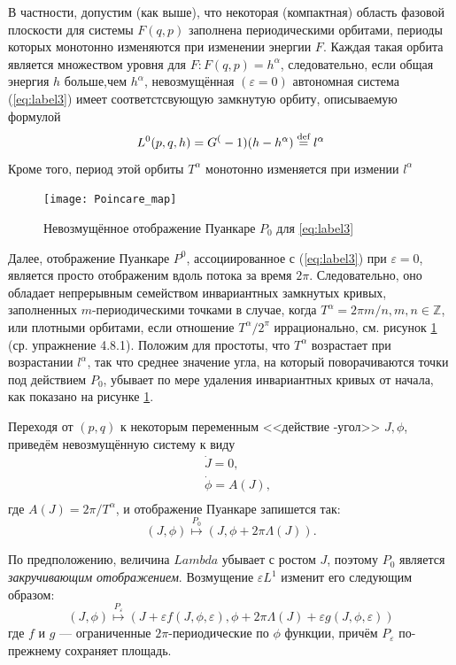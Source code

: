 \documentclass[twoside, a4paper]{article}
\begin{document}
В частности, допустим (как выше), что некоторая (компактная) область фазовой плоскости для системы $F(q,p)$ заполнена периодическими орбитами, периоды которых монотонно изменяются при изменении энергии $F$. Каждая такая орбита является множеством уровня для $F:F(q,p)=h^\alpha$, следовательно, если общая энергия $h$ больше,чем $h^\alpha$, невозмущённая $(\varepsilon=0)$ автономная система (\ref{eq:label3}) имеет соответстсвующую замкнутую орбиту, описываемую формулой
\begin{equation}
L^0(p,q,h)=G^(-1)(h-h^\alpha)\stackrel{\text{def}}{=} l^\alpha
\end{equation}
\renewcommand{\thefigure}{4.8.\arabic{figure}}
Кроме того, период этой орбиты $T^\alpha$ монотонно изменяется при измении $l^\alpha$
\begin{figure}[h]
\centering
\texttt{[image: Poincarе\_map]}
\caption{Невозмущённое отображение Пуанкаре $P_0$ для \ref{eq:label3}}
\label{fig:pic1}
\end{figure}

Далее, отображение Пуанкаре $P^0$, ассоциированное с (\ref{eq:label3}) при $\varepsilon = 0$, является просто отображеним вдоль потока за время $2\pi$. Следовательно, оно обладает непрерывным семейством инвариантных замкнутых кривых, заполненных $m$-периодическими точками в случае, когда $T^\alpha = 2\pi m/n, m,n \in \mathbb{Z}$, или плотными орбитами, если отношение $T^\alpha / 2^\pi$ иррационально, см. рисунок \ref{fig:pic1} (ср. упражнение 4.8.1). Положим для простоты, что $T^\alpha$ возрастает при возрастании $l^\alpha$, так что среднее значение угла, на который поворачиваются точки под действием $P_0$, убывает по мере удаления инвариантных кривых от начала, как показано на рисунке \ref{fig:pic1}.

Переходя от $(p,q)$ к некоторым переменным <<действие -угол>> $J,  \phi$, приведём невозмущённую систему к виду 
\begin{equation}
\text{~}\begin{aligned}
&\dot J = 0, \\
&\dot \phi = A(J),\\
\end{aligned}
\end{equation}
где $A(J) = 2\pi / T^\alpha$, и отображение Пуанкаре запишется так:
\begin{equation}
(J, \phi) \stackrel{P_0}{\longmapsto} (J, \phi + 2 \pi \Lambda (J)).
\label{eq:e4826}
\end{equation} 

По предположению, величина $Lambda$ убывает с ростом $J$, поэтому $P_0$ является \emph{закручивающим отображением}. Возмущение $\varepsilon L^1$ изменит его следующим образом: 
\begin{equation}
(J, \phi) \stackrel{P_\varepsilon}{\longmapsto} (J + \varepsilon f(J, \phi, \varepsilon), \phi + 2 \pi \Lambda (J) + \varepsilon g(J, \phi, \varepsilon))
\label{eq:e4827}
\end{equation} 
где $f$ и $g$ --- ограниченные $2\pi$-периодические по $\phi$ функции, причём $P_\varepsilon$ по-прежнему сохраняет площадь.
\end{document}
